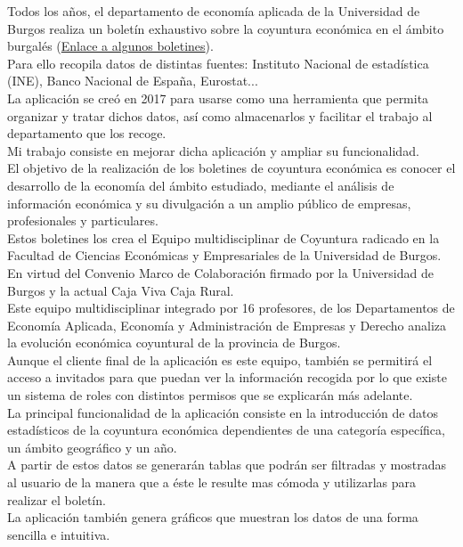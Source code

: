 Todos los años, el departamento de economía aplicada de la Universidad de Burgos realiza un boletín exhaustivo sobre la coyuntura económica en el ámbito burgalés (\href{https://www.ubu.es/departamento-de-economia-aplicada/investigacion-research/grupos-de-investigacion-research-groups/equipo-de-coyuntura-economica-de-burgos}{Enlace a algunos boletines}).\\
Para ello recopila datos de distintas fuentes: Instituto Nacional de estadística (INE), Banco Nacional de España, Eurostat...\\
La aplicación se creó en 2017 para usarse como una herramienta que permita organizar y tratar dichos datos, así como almacenarlos y facilitar el trabajo al departamento que los recoge.\\
Mi trabajo consiste en mejorar dicha aplicación y ampliar su funcionalidad.\\ 
El objetivo de la realización de los boletines de coyuntura económica es conocer el desarrollo de la economía del ámbito estudiado, mediante el análisis de información económica y su divulgación a un amplio público de empresas, profesionales y particulares.\\
Estos boletines los crea el Equipo multidisciplinar de Coyuntura radicado en la Facultad de Ciencias Económicas y Empresariales de la Universidad de Burgos. En virtud del Convenio Marco de Colaboración firmado por la Universidad de Burgos y la actual Caja Viva Caja Rural.\\
Este equipo multidisciplinar integrado por 16 profesores, de los Departamentos de Economía Aplicada, Economía y Administración de Empresas y Derecho analiza la evolución económica coyuntural de la provincia de Burgos.\\
Aunque el cliente final de la aplicación es este equipo, también se permitirá el acceso a invitados para que puedan ver la información recogida por lo que existe un sistema de roles con distintos permisos que se explicarán más adelante.\\
La principal funcionalidad de la aplicación consiste en la introducción de datos estadísticos de la coyuntura económica dependientes de una categoría específica, un ámbito geográfico y un
año.\\
A partir de estos datos se generarán tablas que podrán ser filtradas y mostradas al usuario de la manera que a éste le resulte mas cómoda y utilizarlas para realizar el boletín.\\
La aplicación también genera gráficos que muestran los datos de una forma sencilla e intuitiva.\\
